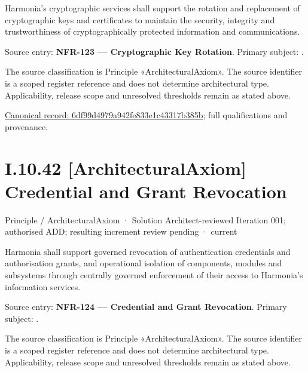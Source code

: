 Harmonia's cryptographic services shall support the rotation and replacement of cryptographic keys and certificates to maintain the security, integrity and trustworthiness of cryptographically protected information and communications.



Source entry: \textbf{NFR-123 — Cryptographic Key Rotation}. Primary subject: \texttt{}.



The source classification is Principle «ArchitecturalAxiom». The source identifier is a scoped register reference and does not determine architectural type. Applicability, release scope and unresolved thresholds remain as stated above.


{\footnotesize \href{../../../../continuum/motivation/principle/architectural-axiom/6df99d4979a942fe833e1c43317b385b.md}{Canonical record: 6df99d4979a942fe833e1c43317b385b}; full qualifications and provenance.}\par
\section*{I.10.42 [ArchitecturalAxiom] Credential and Grant Revocation}
\label{navigation:I.10.42}

\label{element:370d9a6e0e00402aba9720580a2e365e}
{\small Principle / ArchitecturalAxiom · Solution Architect-reviewed Iteration 001; authorised ADD; resulting increment review pending · current}\par

Harmonia shall support governed revocation of authentication credentials and authorisation grants, and operational isolation of components, modules and subsystems through centrally governed enforcement of their access to Harmonia's information services.



Source entry: \textbf{NFR-124 — Credential and Grant Revocation}. Primary subject: \texttt{}.



The source classification is Principle «ArchitecturalAxiom». The source identifier is a scoped register reference and does not determine architectural type. Applicability, release scope and unresolved thresholds remain as stated above.


